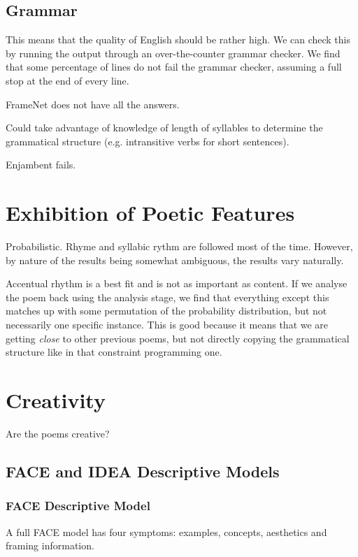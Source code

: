 \subsection{Grammar}
This means that the quality of English should be rather high. We can check this by running the output through an over-the-counter grammar checker. We find that some percentage of lines do not fail the grammar checker, assuming a full stop at the end of every line.

FrameNet does not have all the answers.

Could take advantage of knowledge of length of syllables to determine the grammatical structure (e.g. intransitive verbs for short sentences).

Enjambent fails.

\section{Exhibition of Poetic Features}
Probabilistic. Rhyme and syllabic rythm are followed most of the time. However, by nature of the results being somewhat ambiguous, the results vary naturally.

Accentual rhythm is a best fit and is not as important as content. If we analyse the poem back using the analysis stage, we find that everything except this matches up with some permutation of the probability distribution, but not necessarily one specific instance. This is good because it means that we are getting \textit{close} to other previous poems, but not directly copying the grammatical structure like in that constraint programming one.

\section{Creativity}
Are the poems creative?
\subsection{FACE and IDEA Descriptive Models}
\subsubsection{FACE Descriptive Model}
\label{sec:face}
A full FACE model has four symptoms: examples, concepts, aesthetics and framing information.

